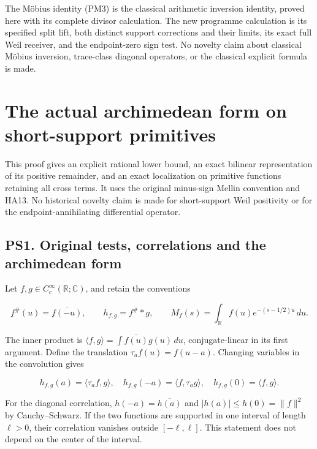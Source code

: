 \documentclass[
  10pt,
  a4paper,
]{article}
\begin{document}
The Möbius identity (PM3) is the classical arithmetic inversion
identity, proved here with its complete divisor calculation. The new
programme calculation is its specified split lift, both distinct support
corrections and their limits, its exact full Weil receiver, and the
endpoint-zero sign test. No novelty claim about classical Möbius
inversion, trace-class diagonal operators, or the classical explicit
formula is made.

\clearpage

\section{The actual archimedean form on short-support
primitives}\label{the-actual-archimedean-form-on-short-support-primitives}

This proof gives an explicit rational lower bound, an exact bilinear
representation of its positive remainder, and an exact localization on
primitive functions retaining all cross terms. It uses the original
minus-sign Mellin convention and HA13. No historical novelty claim is
made for short-support Weil positivity or for the endpoint-annihilating
differential operator.

\subsection{PS1. Original tests, correlations and the archimedean
form}\label{ps1.-original-tests-correlations-and-the-archimedean-form}

Let \(f,g\in C_c^\infty(\mathbb R;\mathbb C)\), and retain the
conventions

\[
f^\#(u)=\overline{f(-u)},\qquad
h_{f,g}=f^\#*g,\qquad
M_f(s)=\int_{\mathbb R}f(u)e^{-(s-1/2)u}\,du.
\tag{PS1}
\]

The inner product is \(\langle f,g\rangle=\int\overline{f(u)}g(u)\,du\),
conjugate-linear in its first argument. Define the translation
\(\tau_a f(u)=f(u-a)\). Changing variables in the convolution gives

\[
h_{f,g}(a)=\langle\tau_a f,g\rangle,
\quad h_{f,g}(-a)=\langle f,\tau_a g\rangle,
\quad h_{f,g}(0)=\langle f,g\rangle.
\tag{PS2}
\]

For the diagonal correlation, \(h(-a)=\overline{h(a)}\) and
\(|h(a)|\le h(0)=\|f\|^2\) by Cauchy--Schwarz. If the two functions are
supported in one interval of length \(\ell>0\), their correlation
vanishes outside \([-\ell,\ell]\). This statement does not depend on the
center of the interval.
\end{document}
